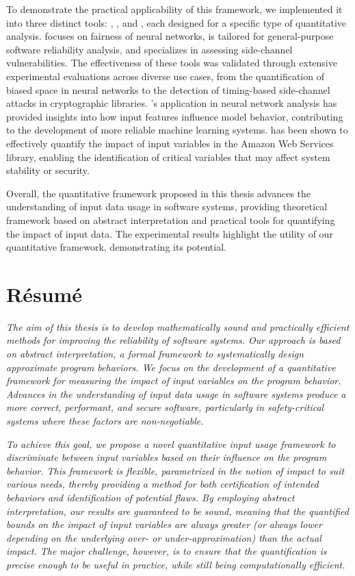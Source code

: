 To demonstrate the practical applicability of this framework, we implemented it into three distinct tools: \libra, \impatto, and \timesec, each designed for a specific type of quantitative analysis. \libra{} focuses on fairness of neural networks, \impatto{} is tailored for general-purpose software reliability analysis, and \timesec{} specializes in assessing side-channel vulnerabilities. The effectiveness of these tools was validated through extensive experimental evaluations across diverse use cases, from the quantification of biased space in neural networks to the detection of timing-based side-channel attacks in cryptographic libraries.
\libra's application in neural network analysis has provided insights into how input features influence model behavior, contributing to the development of more reliable machine learning systems.
\timesec{} has been shown to effectively quantify the impact of input variables in the Amazon Web Services \bignum{} library, enabling the identification of critical variables that may affect system stability or security.

Overall, the quantitative framework proposed in this thesis advances the understanding of input data usage in software systems, providing theoretical framework based on abstract interpretation and practical tools for quantifying the impact of input data. The experimental results highlight the utility of our quantitative framework, demonstrating its potential.


\chapter*{Résumé}

\emph{
The aim of this thesis is to develop mathematically sound and practically efficient methods for improving the reliability of software systems.
Our approach is based on abstract interpretation, a formal framework to systematically design approximate program behaviors.
We focus on the development of a quantitative framework for measuring the impact of input variables on the program behavior.
Advances in the understanding of input data usage in software systems produce a more correct, performant, and secure software, particularly in safety-critical systems where these factors are non-negotiable.}

\emph{
To achieve this goal, we propose a novel quantitative input usage framework to discriminate between input variables based on their influence on the program behavior.
This framework is flexible, parametrized in the notion of impact to suit various needs, thereby providing a method for both certification of intended behaviors and identification of potential flaws.
By employing abstract interpretation, our results are guaranteed to be sound, meaning that the quantified bounds on the impact of input variables are always greater (or always lower depending on the underlying over- or under-approximation) than the actual impact.
The major challenge, however, is to ensure that the quantification is precise enough to be useful in practice, while still being computationally efficient.}

